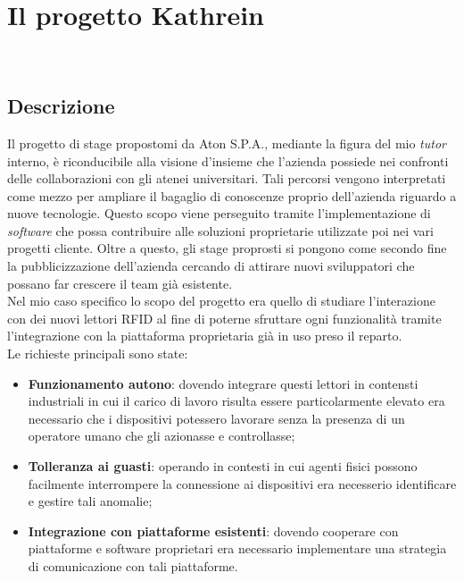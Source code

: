 
\chapter{Il progetto Kathrein}
\label{cap:lo-stage}

\\

\section{Descrizione}
Il progetto di stage propostomi da Aton S.P.A., mediante la figura del mio \emph{tutor} interno, è riconducibile alla visione d'insieme che l'azienda possiede
nei confronti delle collaborazioni con gli atenei universitari. Tali percorsi vengono interpretati come mezzo per ampliare il bagaglio di conoscenze proprio 
dell'azienda riguardo a nuove tecnologie. Questo scopo viene perseguito tramite l'implementazione di \emph{software} che possa contribuire alle soluzioni 
proprietarie utilizzate poi nei vari progetti cliente. Oltre a questo, gli stage proprosti si pongono come secondo fine la pubblicizzazione dell'azienda 
cercando di attirare nuovi sviluppatori che possano far crescere il team già esistente. \\
Nel mio caso specifico lo scopo del progetto era quello di studiare l'interazione con dei nuovi lettori RFID al fine di poterne sfruttare ogni funzionalità 
tramite l'integrazione con la piattaforma proprietaria già in uso preso il reparto. \\
Le richieste principali sono state:
\begin{itemize}
    \item \textbf{Funzionamento autono}: dovendo integrare questi lettori in contensti industriali in cui il carico di lavoro risulta essere particolarmente elevato
    era necessario che i dispositivi potessero lavorare senza la presenza di un operatore umano che gli azionasse e controllasse;
    \item \textbf{Tolleranza ai guasti}: operando in contesti in cui agenti fisici possono facilmente interrompere la connessione ai dispositivi era necesserio
    identificare e gestire tali anomalie;
    \item \textbf{Integrazione con piattaforme esistenti}: dovendo cooperare con piattaforme e software proprietari era necessario implementare una strategia
    di comunicazione con tali piattaforme.
\end{itemize}

